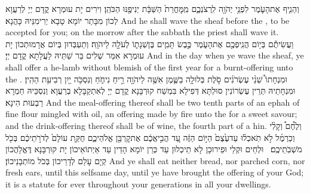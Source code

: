 {וְהֵנִ֧יף אֶת\maqqaf הָעֹ֛מֶר לִפְנֵ֥י יְהֹוָ֖ה לִֽרְצֹנְכֶ֑ם מִֽמׇּחֳרַת֙ הַשַּׁבָּ֔ת יְנִיפֶ֖נּוּ הַכֹּהֵֽן׃}
{וִירִים יָת עוּמְרָא קֳדָם יְיָ לְרַעֲוָא לְכוֹן מִבָּתַר יוֹמָא טָבָא יְרִימִנֵּיהּ כָּהֲנָא׃}
{And he shall wave the sheaf before the \lord, to be accepted for you; on the morrow after the sabbath the priest shall wave it.}{}
{וַעֲשִׂיתֶ֕ם בְּי֥וֹם הֲנִֽיפְכֶ֖ם אֶת\maqqaf הָעֹ֑מֶר כֶּ֣בֶשׂ תָּמִ֧ים בֶּן\maqqaf שְׁנָת֛וֹ לְעֹלָ֖ה לַיהֹוָֽה׃}
{וְתַעְבְּדוּן בְּיוֹם אֲרָמוּתְכוֹן יָת עוּמְרָא אִמַּר שְׁלִים בַּר שַׁתֵּיהּ לַעֲלָתָא קֳדָם יְיָ׃}
{And in the day when ye wave the sheaf, ye shall offer a he-lamb without blemish of the first year for a burnt-offering unto the \lord.}{}
{וּמִנְחָתוֹ֩ שְׁנֵ֨י עֶשְׂרֹנִ֜ים סֹ֣לֶת בְּלוּלָ֥ה בַשֶּׁ֛מֶן אִשֶּׁ֥ה לַיהֹוָ֖ה רֵ֣יחַ נִיחֹ֑חַ וְנִסְכֹּ֥ה יַ֖יִן רְבִיעִ֥ת הַהִֽין׃}
{וּמִנְחָתֵיהּ תְּרֵין עֶשְׂרוֹנִין סוּלְתָּא דְּפִילָא בִּמְשַׁח קוּרְבָּנָא קֳדָם יְיָ לְאִתְקַבָּלָא בְרַעֲוָא וְנִסְכֵּיהּ חַמְרָא רַבְעוּת הִינָא׃}
{And the meal-offering thereof shall be two tenth parts of an ephah of fine flour mingled with oil, an offering made by fire unto the \lord\space for a sweet savour; and the drink-offering thereof shall be of wine, the fourth part of a hin.}{}
{וְלֶ֩חֶם֩ וְקָלִ֨י וְכַרְמֶ֜ל לֹ֣א תֹֽאכְל֗וּ עַד\maqqaf עֶ֙צֶם֙ הַיּ֣וֹם הַזֶּ֔ה עַ֚ד הֲבִ֣יאֲכֶ֔ם אֶת\maqqaf קׇרְבַּ֖ן אֱלֹהֵיכֶ֑ם חֻקַּ֤ת עוֹלָם֙ לְדֹרֹ֣תֵיכֶ֔ם בְּכֹ֖ל מֹשְׁבֹֽתֵיכֶֽם׃ \setuma }
{וּלְחֵים וּקְלֵי וּפֵירוּכָן לָא תֵיכְלוּן עַד כְּרַן יוֹמָא הָדֵין עַד אַיְתוֹאֵיכוֹן יָת קוּרְבָּנָא דֶּאֱלָהֲכוֹן קְיָם עָלַם לְדָרֵיכוֹן בְּכֹל מוֹתְבָנֵיכוֹן׃}
{And ye shall eat neither bread, nor parched corn, nor fresh ears, until this selfsame day, until ye have brought the offering of your God; it is a statute for ever throughout your generations in all your dwellings.}{}
